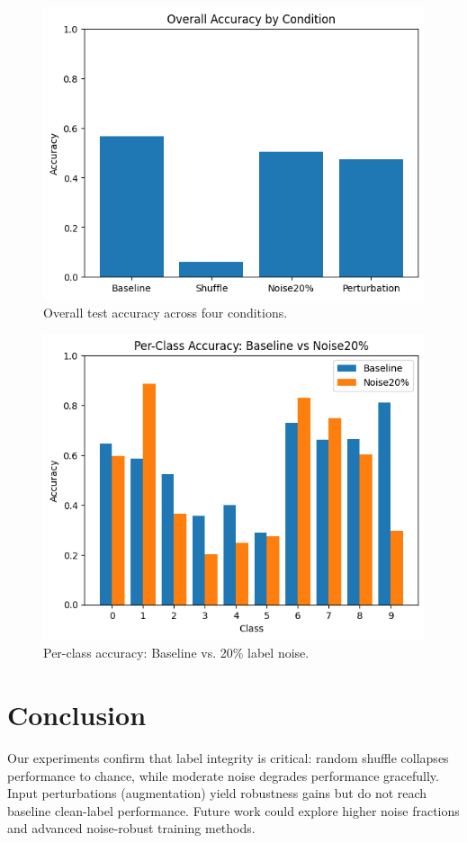 \documentclass[10pt,twocolumn,letterpaper]{article}
\begin{document}
\begin{figure}[t]
  \centering
  \includegraphics[width=0.8\linewidth]{overall_accuracy.png}
  \caption{Overall test accuracy across four conditions.}
  \label{fig:overall_bar}
\end{figure}

\begin{figure}[t]
  \centering
  \includegraphics[width=0.8\linewidth]{per_class_accuracy.png}
  \caption{Per-class accuracy: Baseline vs. 20\% label noise.}
  \label{fig:perclass_bar}
\end{figure}

\section{Conclusion}
Our experiments confirm that label integrity is critical: random shuffle collapses performance to chance, while moderate noise degrades performance gracefully. Input perturbations (augmentation) yield robustness gains but do not reach baseline clean-label performance. Future work could explore higher noise fractions and advanced noise-robust training methods.
\end{document}
